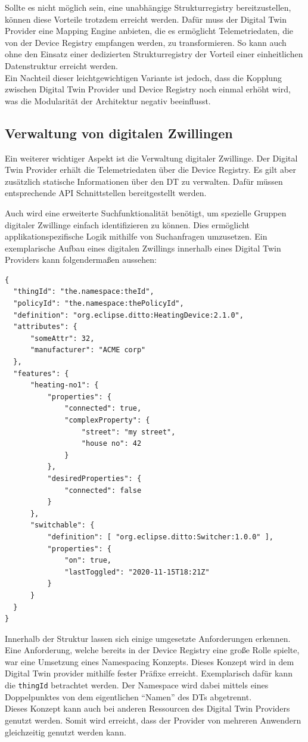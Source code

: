 Sollte es nicht möglich sein, eine unabhängige Strukturregistry bereitzustellen, können diese Vorteile trotzdem erreicht werden. Dafür muss der Digital Twin Provider eine Mapping Engine anbieten, die es ermöglicht Telemetriedaten, die von der Device Registry empfangen werden, zu transformieren. So kann auch ohne den Einsatz einer dedizierten Strukturregistry der Vorteil einer einheitlichen Datenstruktur erreicht werden.\\
Ein Nachteil dieser leichtgewichtigen Variante ist jedoch, dass die Kopplung zwischen Digital Twin Provider und Device Registry noch einmal erhöht wird, was die Modularität der Architektur negativ beeinflusst.

\clearpage
\subsection{Verwaltung von digitalen Zwillingen}

Ein weiterer wichtiger Aspekt ist die Verwaltung digitaler Zwillinge. Der Digital Twin Provider erhält die Telemetriedaten über die Device Registry. Es gilt aber zusätzlich statische Informationen über den \ac{DT} zu verwalten. Dafür müssen entsprechende API Schnittstellen bereitgestellt werden.

Auch wird eine erweiterte Suchfunktionalität benötigt, um spezielle Gruppen digitaler Zwillinge einfach identifizieren zu können. Dies ermöglicht applikationspezifische Logik mithilfe von Suchanfragen umzusetzen. Ein exemplarische Aufbau eines digitalen Zwillings innerhalb eines Digital Twin Providers kann folgendermaßen aussehen:

\begin{verbatim}
{
  "thingId": "the.namespace:theId",
  "policyId": "the.namespace:thePolicyId",
  "definition": "org.eclipse.ditto:HeatingDevice:2.1.0",
  "attributes": {
      "someAttr": 32,
      "manufacturer": "ACME corp"
  },
  "features": {
      "heating-no1": {
          "properties": {
              "connected": true,
              "complexProperty": {
                  "street": "my street",
                  "house no": 42
              }
          },
          "desiredProperties": {
              "connected": false
          }
      },
      "switchable": {
          "definition": [ "org.eclipse.ditto:Switcher:1.0.0" ],
          "properties": {
              "on": true,
              "lastToggled": "2020-11-15T18:21Z"
          }
      }
  }
}
\end{verbatim}

Innerhalb der Struktur lassen sich einige umgesetzte Anforderungen erkennen. Eine Anforderung, welche bereits in der Device Registry eine große Rolle spielte, war eine Umsetzung eines Namespacing Konzepts. Dieses Konzept wird in dem Digital Twin provider mithilfe fester Präfixe erreicht. Exemplarisch dafür kann die \texttt{thingId} betrachtet werden. Der Namespace wird dabei mittels eines Doppelpunktes von dem eigentlichen \enquote{Namen} des \ac{DT}s abgetrennt. \\
Dieses Konzept kann auch bei anderen Ressourcen des Digital Twin Providers genutzt werden. Somit wird erreicht, dass der Provider von mehreren Anwendern gleichzeitig genutzt werden kann.

